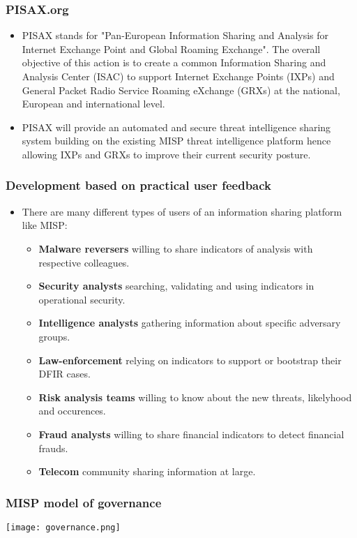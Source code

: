\begin{frame}
\frametitle{PISAX.org}
        \begin{itemize}
        \item PISAX stands for "Pan-European Information Sharing and Analysis for Internet Exchange Point and Global Roaming Exchange".  The overall objective of this action is to create a common Information Sharing and Analysis Center (ISAC) to support Internet Exchange Points (IXPs) and  General Packet Radio Service Roaming eXchange (GRXs) at the national, European and international level.
\item PISAX will provide an automated and secure threat intelligence sharing system building on the existing MISP threat intelligence platform hence allowing IXPs and GRXs to improve their current security posture.
        \end{itemize}
\end{frame}


\begin{frame}
\frametitle{Development based on practical user feedback}
\begin{itemize}
\item There are many different types of users of an information sharing platform like MISP:
        \begin{itemize}
                \item {\bf Malware reversers} willing to share indicators of analysis with respective colleagues.
                \item {\bf Security analysts} searching, validating and using indicators in operational security.
                \item {\bf Intelligence analysts} gathering information about specific adversary groups.
                \item {\bf Law-enforcement} relying on indicators to support or bootstrap their DFIR cases.
                \item {\bf Risk analysis teams} willing to know about the new threats, likelyhood and occurences.
                \item {\bf Fraud analysts} willing to share financial indicators to detect financial frauds.
                \item {\bf Telecom} community sharing information at large.
        \end{itemize}
\end{itemize}
\end{frame}

\begin{frame}
\frametitle{MISP model of governance}
\texttt{[image: governance.png]}
\end{frame}

